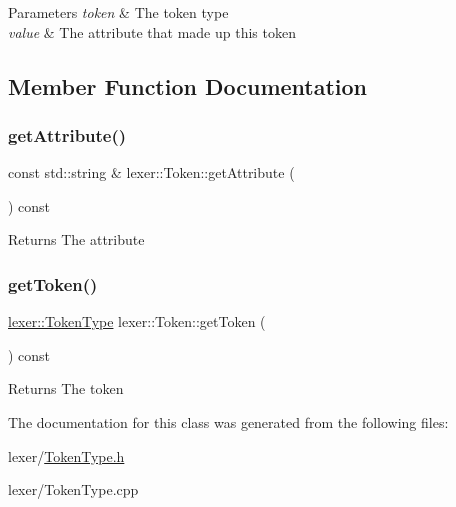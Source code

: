 \begin{DoxyParams}{Parameters}
{\em token} & The token type \\
\hline
{\em value} & The attribute that made up this token \\
\hline
\end{DoxyParams}


\subsection{Member Function Documentation}
\mbox{\label{classlexer_1_1Token_a6b50f258588b97a8087edf17ec3f2762}} 
\subsubsection{\texorpdfstring{get\+Attribute()}{getAttribute()}}
{\footnotesize\ttfamily const std\+::string \& lexer\+::\+Token\+::get\+Attribute (\begin{DoxyParamCaption}{ }\end{DoxyParamCaption}) const}

\begin{DoxyReturn}{Returns}
The attribute 
\end{DoxyReturn}
\mbox{\label{classlexer_1_1Token_a8375087ce4b276ed175ab3d171f76fd1}} 
\subsubsection{\texorpdfstring{get\+Token()}{getToken()}}
{\footnotesize\ttfamily \hyperlink{TokenType_8h_a8609501a650c2bf52e8397c88de5770f}{lexer\+::\+Token\+Type} lexer\+::\+Token\+::get\+Token (\begin{DoxyParamCaption}{ }\end{DoxyParamCaption}) const}

\begin{DoxyReturn}{Returns}
The token 
\end{DoxyReturn}


The documentation for this class was generated from the following files\+:\begin{DoxyCompactItemize}
\item 
lexer/\hyperlink{TokenType_8h}{Token\+Type.\+h}\item 
lexer/Token\+Type.\+cpp\end{DoxyCompactItemize}
